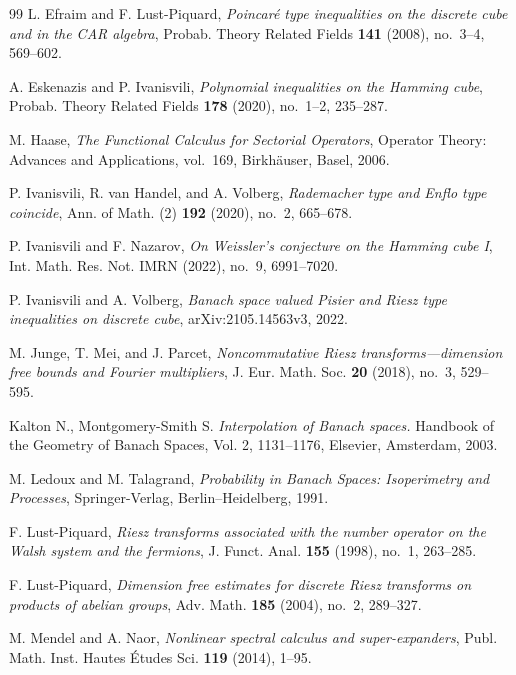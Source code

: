 \documentclass{amsart}
\numberwithin{equation}{section}
\theoremstyle{definition}
\theoremstyle{remark}
\newcommand{\1}{\mathbf 1}
\begin{document}
\begin{thebibliography}{99}
L. Efraim and F. Lust-Piquard,
\emph{Poincar\'e type inequalities on the discrete cube and in the CAR algebra},
Probab. Theory Related Fields \textbf{141} (2008), no.~3--4, 569--602.


A. Eskenazis and P. Ivanisvili,
\emph{Polynomial inequalities on the Hamming cube},
Probab. Theory Related Fields \textbf{178} (2020), no.~1--2, 235--287.




M. Haase,
\emph{The Functional Calculus for Sectorial Operators},
Operator Theory: Advances and Applications, vol.~169,
Birkh\"auser, Basel, 2006.

P. Ivanisvili, R. van Handel, and A. Volberg,
\emph{Rademacher type and Enflo type coincide},
Ann. of Math. (2) \textbf{192} (2020), no.~2, 665--678.

P. Ivanisvili and F. Nazarov,
\emph{On Weissler's conjecture on the Hamming cube I},
Int. Math. Res. Not. IMRN (2022), no.~9, 6991--7020.

P. Ivanisvili and A. Volberg,
\emph{Banach space valued Pisier and Riesz type inequalities on discrete cube},
arXiv:2105.14563v3, 2022.

M. Junge, T. Mei, and J. Parcet,
\emph{Noncommutative Riesz transforms---dimension free bounds and Fourier
multipliers},
J. Eur. Math. Soc. \textbf{20} (2018), no.~3, 529--595.

 Kalton N., Montgomery-Smith S. {\it Interpolation of Banach spaces.} Handbook of the Geometry of Banach Spaces, Vol. 2, 1131--1176, Elsevier, Amsterdam, 2003.

M. Ledoux and M. Talagrand,
\emph{Probability in Banach Spaces: Isoperimetry and Processes},
Springer-Verlag, Berlin--Heidelberg, 1991.

F. Lust-Piquard,
\emph{Riesz transforms associated with the number operator on the Walsh system
and the fermions},
J. Funct. Anal. \textbf{155} (1998), no.~1, 263--285.

F. Lust-Piquard,
\emph{Dimension free estimates for discrete Riesz transforms on products of
abelian groups},
Adv. Math. \textbf{185} (2004), no.~2, 289--327.

M. Mendel and A. Naor,
\emph{Nonlinear spectral calculus and super-expanders},
Publ. Math. Inst. Hautes \'Etudes Sci. \textbf{119} (2014), 1--95.


\end{thebibliography}
\end{document}
